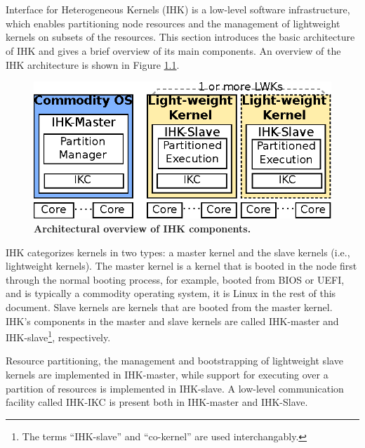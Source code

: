 \documentclass[twoside,11pt,fleqn]{book}
\begin{document}
\tableofcontents
\listoffigures   

\linenumbers

\chapter{}
\section{}

Interface for Heterogeneous Kernels (IHK) is a low-level software
infrastructure, which enables partitioning node resources and the
management of lightweight kernels on subsets of the resources.
This section introduces the basic architecture of IHK and gives a brief
overview of its main components.
An overview of the IHK architecture is shown in Figure \ref{fig:ihk-overall}.

\begin{figure}[h!]
\centerline{
\includegraphics[width=0.60\linewidth]{figs/ihk-design.eps}
}
\caption{\textbf{Architectural overview of IHK components.}}
\label{fig:ihk-overall}
\end{figure}

IHK categorizes kernels in two types: a master kernel and the slave kernels
(i.e., lightweight kernels).
The master kernel is a kernel that is booted in the node first through the
normal booting process,
for example, booted from BIOS or UEFI, and is typically a
commodity operating system, it is Linux in the rest of this document.
Slave kernels are kernels that are booted from the master kernel.
IHK's components in the master and slave kernels are called IHK-master and
IHK-slave\footnote{The terms ``IHK-slave'' and ``co-kernel'' are used interchangably.}, respectively.

Resource partitioning, the management and bootstrapping of lightweight slave
kernels are implemented in IHK-master,
while support for executing over a partition of resources
is implemented in IHK-slave.
A low-level communication facility called IHK-IKC is present
both in IHK-master and IHK-Slave.
\end{document}
